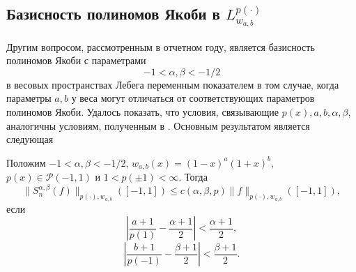 \subsection{Базисность полиномов Якоби в \texorpdfstring{$L^{p(\cdot)}_{w_{a,b}}$}{Lp(x)w}}
Другим вопросом, рассмотренным в отчетном году, является базисность полиномов Якоби с параметрами
$$-1<\alpha,\beta<-1/2$$
в весовых пространствах Лебега переменным показателем в том случае, когда параметры $a,b$ у веса могут отличаться от соответствующих параметров полиномов Якоби. Удалось показать, что условия, связывающие $p(x),a,b,\alpha,\beta$, аналогичны условиям, полученным в \cite{tad-Muckenhoupt}.
Основным результатом является следующая
\begin{theorem}
  Положим $-1<\alpha,\beta<-1/2$, $w_{a,b}(x)=(1-x)^a(1+x)^b$, $p(x)\in\mathcal{P}(-1,1)$ и $1<p(\pm1)<\infty$. Тогда
$$
\|S_n^{\alpha,\beta}(f)\|_{p(\cdot),w_{a,b}}([-1,1])\le c(\alpha,\beta,p)\|f\|_{p(\cdot),w_{a,b}}([-1,1]),
$$
если
$$
\left|\frac{a+1}{p(1)}-\frac{\alpha+1}2\right|<\frac{\alpha+1}2,
$$
$$
\left|\frac{b+1}{p(-1)}-\frac{\beta+1}2\right|<\frac{\beta+1}2.
$$
\end{theorem}



